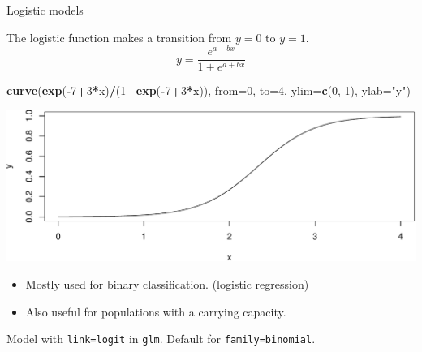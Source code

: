 \documentclass[
  ignorenonframetext,
]{beamer}
\newenvironment{Shaded}{\begin{snugshade}}{\end{snugshade}}
\newcommand{\DataTypeTok}[1]{\textcolor[rgb]{0.13,0.29,0.53}{#1}}
\newcommand{\DecValTok}[1]{\textcolor[rgb]{0.00,0.00,0.81}{#1}}
\newcommand{\KeywordTok}[1]{\textcolor[rgb]{0.13,0.29,0.53}{\textbf{#1}}}
\newcommand{\NormalTok}[1]{#1}
\newcommand{\OperatorTok}[1]{\textcolor[rgb]{0.81,0.36,0.00}{\textbf{#1}}}
\newcommand{\StringTok}[1]{\textcolor[rgb]{0.31,0.60,0.02}{#1}}
\providecommand{\tightlist}{%
  \setlength{\itemsep}{0pt}\setlength{\parskip}{0pt}}
\begin{document}
\begin{frame}[fragile]{Logistic models}
\protect\hypertarget{logistic-models}{}

The logistic function makes a transition from \(y=0\) to \(y=1\). \[
y=\frac{e^{a+bx}}{1+e^{a+bx}}
\]

\scriptsize

\begin{Shaded}
\begin{Highlighting}[]
\KeywordTok{curve}\NormalTok{(}\KeywordTok{exp}\NormalTok{(}\OperatorTok{-}\DecValTok{7}\OperatorTok{+}\DecValTok{3}\OperatorTok{*}\NormalTok{x)}\OperatorTok{/}\NormalTok{(}\DecValTok{1}\OperatorTok{+}\KeywordTok{exp}\NormalTok{(}\OperatorTok{-}\DecValTok{7}\OperatorTok{+}\DecValTok{3}\OperatorTok{*}\NormalTok{x)), }\DataTypeTok{from=}\DecValTok{0}\NormalTok{, }\DataTypeTok{to=}\DecValTok{4}\NormalTok{, }\DataTypeTok{ylim=}\KeywordTok{c}\NormalTok{(}\DecValTok{0}\NormalTok{, }\DecValTok{1}\NormalTok{), }\DataTypeTok{ylab=}\StringTok{"y"}\NormalTok{)}
\end{Highlighting}
\end{Shaded}

\includegraphics{signal_files/figure-beamer/unnamed-chunk-9-1.pdf}

\normalsize

\begin{itemize}
\tightlist
\item
  Mostly used for binary classification. (logistic regression)
\item
  Also useful for populations with a carrying capacity.
\end{itemize}

Model with \texttt{link=logit} in \texttt{glm}. Default for
\texttt{family=binomial}.

\end{frame}
\end{document}
